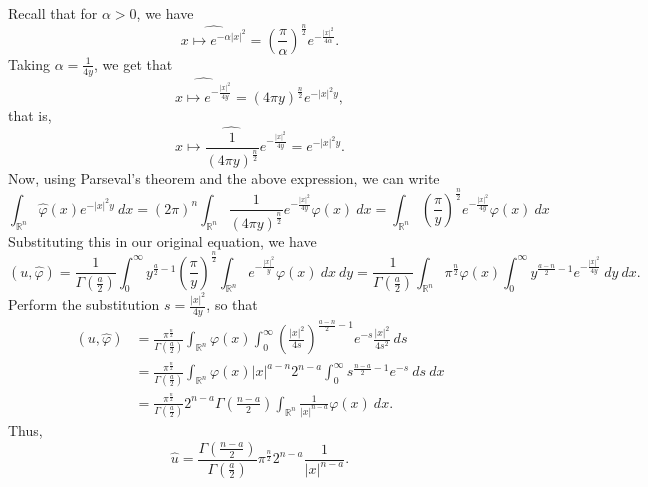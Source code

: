 \documentclass[10pt]{amsart}
\theoremstyle{thmstyle}
\theoremstyle{defstyle}
\newcommand{\R}{\mathbb{R}}
\newcommand{\wh}[1]{\widehat{#1}}
\begin{document}
Recall that for $\alpha > 0$, we have 
\begin{equation*}
    \wh{x\mapsto e^{-\alpha |x|^2}} = \left(\frac{\pi}{\alpha}\right)^{\frac{n}{2}}e^{-\frac{|x|^2}{4\alpha}}.
\end{equation*}
Taking $\alpha = \frac{1}{4y}$, we get that 
\begin{equation*}
    \wh{x\mapsto e^{-\frac{|x|^2}{4y}}} = (4\pi y)^{\frac{n}{2}} e^{-|x|^2y},
\end{equation*}
that is, 
\begin{equation*}
    \wh{x\mapsto \frac{1}{(4\pi y)^{\frac{n}{2}}}e^{-\frac{|x|^2}{4y}}} = e^{-|x|^2y}.
\end{equation*}
Now, using Parseval's theorem and the above expression, we can write 
\begin{equation*}
    \int_{\R^n}\wh\varphi(x)e^{-|x|^2y}~dx = (2\pi)^n\int_{\R^n} \frac{1}{(4\pi y)^{\frac{n}{2}}}e^{-\frac{|x|^2}{4y}}\varphi(x)~dx = \int_{\R^n} \left(\frac{\pi}{y}\right)^{\frac{n}{2}}e^{-\frac{|x|^2}{4y}}\varphi(x)~dx
\end{equation*}
Substituting this in our original equation, we have 
\begin{equation*}
    (u, \wh\varphi) = \frac{1}{\Gamma\left(\frac{a}{2}\right)}\int_0^\infty y^{\frac{a}{2} - 1}\left(\frac{\pi}{y}\right)^{\frac{n}{2}}\int_{\R^n} e^{-\frac{|x|^2}{y}}\varphi(x)~dx~dy = \frac{1}{\Gamma\left(\frac{a}{2}\right)}\int_{\R^n} \pi^{\frac{n}{2}}\varphi(x)\int_0^\infty y^{\frac{a - n}{2} - 1}e^{-\frac{|x|^2}{4y}}~dy~dx.
\end{equation*}
Perform the substitution $s = \frac{|x|^2}{4y}$, so that 
\begin{align*}
    (u,\wh\varphi) &= \frac{\pi^{\frac{n}{2}}}{\Gamma\left(\frac{a}{2}\right)}\int_{\R^n} \varphi(x)\int_0^\infty\left(\frac{|x|^2}{4s}\right)^{\frac{a - n}{2} - 1}e^{-s}\frac{|x|^2}{4s^2}~ds\\
    &= \frac{\pi^{\frac{n}{2}}}{\Gamma\left(\frac{a}{2}\right)}\int_{\R^n}\varphi(x)|x|^{a - n}2^{n - a}\int_0^\infty s^{\frac{n - a}{2} - 1}e^{-s}~ds~dx\\
    &= \frac{\pi^{\frac{n}{2}}}{\Gamma\left(\frac{a}{2}\right)}2^{n - a}\Gamma\left(\frac{n - a}{2}\right)\int_{\R^n} \frac{1}{|x|^{n - a}}\varphi(x)~dx.
\end{align*}
Thus, 
\begin{equation*}
    \wh u = \frac{\Gamma\left(\frac{n - a}{2}\right)}{\Gamma\left(\frac{a}{2}\right)}\pi^{\frac{n}{2}}2^{n - a}\frac{1}{|x|^{n - a}}.
\end{equation*}
\end{document}
